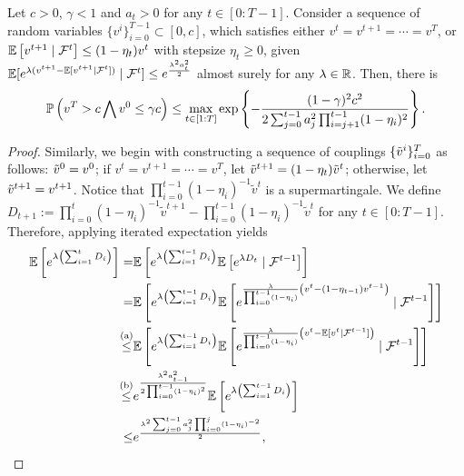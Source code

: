 \begin{lemma}\label{aux-2}
	Let $c>0$, $\gamma<1$ and $a_t>0$ for any $t\in[0:T-1]$. Consider a sequence of random variables $\{v^i\}_{i=0}^{T-1}\subset[0,c]$, which satisfies either $v^t=v^{t+1}=\cdots=v^T$, or $\mathbb{E}\left[v^{t+1}\mid\mathcal{F}^t\right]\leq(1-\eta_t)v^t$ with stepsize $\eta_t\geq0$, given $\mathbb{E}[e^{\lambda(v^{t+1}-\mathbb{E}[v^{t+1}\mid\mathcal{F}^t])}\mid\mathcal{F}^t]\leq e^{\frac{\lambda^2a_t^2}{2}}$ almost surely for any $\lambda\in\mathbb{R}$. Then, there is 
    \begin{align}
        \mathbb{P}\left(v^T>c\bigwedge v^0\leq\gamma c\right)\leq\max_{t\in[1:T]}\exp\left\{-\frac{(1-\gamma)^2c^2}{2\sum_{j=0}^{t-1}a_j^2\prod_{i=j+1}^{t-1}(1-\eta_i)^{2}}\right\}.\notag
    \end{align}
\end{lemma}
\begin{proof}
    Similarly, we begin with constructing a sequence of couplings $\{\Tilde{v}^i\}_{i=0}^T$ as follows: $\Tilde{v}^0=v^0$; if $v^t=v^{t+1}=\cdots=v^T$, let $\Tilde{v}^{t+1}=(1-\eta_t)\Tilde{v}^t$; otherwise, let $\Tilde{v}^{t+1}=v^{t+1}$. Notice that $\prod_{i=0}^{t-1}(1-\eta_i)^{-1}\tilde{v}^t$ is a supermartingale. We define $D_{t+1}:=\prod_{i=0}^{t}(1-\eta_i)^{-1}\tilde{v}^{t+1}-\prod_{i=0}^{t-1}(1-\eta_i)^{-1}\tilde{v}^t$ for any $t\in[0:T-1]$. Therefore, applying iterated expectation yields 
    \begin{align}\label{eq-sub-gaussian}
        \mathbb{E}\left[e^{\lambda\left(\sum_{i=1}^tD_i\right)}\right]=&\mathbb{E}\left[e^{\lambda\left(\sum_{i=1}^{t-1}D_{i}\right)}\mathbb{E}\left[e^{\lambda D_t}\mid\mathcal{F}^{t-1}\right]\right]\notag
        \\
        =&\mathbb{E}\left[e^{\lambda\left(\sum_{i=1}^{t-1}D_{i}\right)}\mathbb{E}\left[e^{\frac{\lambda}{\prod_{i=0}^{t-1}(1-\eta_i)} \left(v^{t}-(1-\eta_{t-1})v^{t-1}\right)}\mid\mathcal{F}^{t-1}\right]\right]
        \notag
        \\
        \overset{\text{(a)}}{\leq}&\mathbb{E}\left[e^{\lambda\left(\sum_{i=1}^{t-1}D_{i}\right)}\mathbb{E}\left[e^{\frac{\lambda}{\prod_{i=0}^{t-1}(1-\eta_i)} \left(v^{t}-\mathbb{E}[v^t\mid\mathcal{F}^{t-1}]\right)}\mid\mathcal{F}^{t-1}\right]\right]
        \notag
        \\
        \overset{\text{(b)}}{\leq}&e^{\frac{\lambda^2a_{t-1}^2}{2\prod_{i=0}^{t-1}(1-\eta_i)^2}}\mathbb{E}\left[e^{\lambda\left(\sum_{i=1}^{t-1}D_{i}\right)}\right]
        \notag
        \\
        \leq&e^{\frac{\lambda^2\sum_{j=0}^{t-1}a_j^2\prod_{i=0}^j(1-\eta_i)^{-2}}{2}},
    \end{align}

\end{proof}
